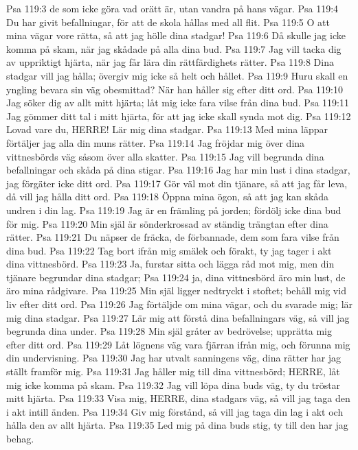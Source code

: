 Psa 119:3  de som icke göra vad orätt är, utan vandra på hans vägar.
Psa 119:4  Du har givit befallningar, för att de skola hållas med all flit.
Psa 119:5  O att mina vägar vore rätta, så att jag hölle dina stadgar!
Psa 119:6  Då skulle jag icke komma på skam, när jag skådade på alla dina bud.
Psa 119:7  Jag vill tacka dig av uppriktigt hjärta, när jag får lära din rättfärdighets rätter.
Psa 119:8  Dina stadgar vill jag hålla; övergiv mig icke så helt och hållet.
Psa 119:9  Huru skall en yngling bevara sin väg obesmittad? När han håller sig efter ditt ord.
Psa 119:10  Jag söker dig av allt mitt hjärta; låt mig icke fara vilse från dina bud.
Psa 119:11  Jag gömmer ditt tal i mitt hjärta, för att jag icke skall synda mot dig.
Psa 119:12  Lovad vare du, HERRE! Lär mig dina stadgar.
Psa 119:13  Med mina läppar förtäljer jag alla din muns rätter.
Psa 119:14  Jag fröjdar mig över dina vittnesbörds väg såsom över alla skatter.
Psa 119:15  Jag vill begrunda dina befallningar och skåda på dina stigar.
Psa 119:16  Jag har min lust i dina stadgar, jag förgäter icke ditt ord.
Psa 119:17  Gör väl mot din tjänare, så att jag får leva, då vill jag hålla ditt ord.
Psa 119:18  Öppna mina ögon, så att jag kan skåda undren i din lag.
Psa 119:19  Jag är en främling på jorden; fördölj icke dina bud för mig.
Psa 119:20  Min själ är sönderkrossad av ständig trängtan efter dina rätter.
Psa 119:21  Du näpser de fräcka, de förbannade, dem som fara vilse från dina bud.
Psa 119:22  Tag bort ifrån mig smälek och förakt, ty jag tager i akt dina vittnesbörd.
Psa 119:23  Ja, furstar sitta och lägga råd mot mig, men din tjänare begrundar dina stadgar;
Psa 119:24  ja, dina vittnesbörd äro min lust, de äro mina rådgivare.
Psa 119:25  Min själ ligger nedtryckt i stoftet; behåll mig vid liv efter ditt ord.
Psa 119:26  Jag förtäljde om mina vägar, och du svarade mig; lär mig dina stadgar.
Psa 119:27  Lär mig att förstå dina befallningars väg, så vill jag begrunda dina under.
Psa 119:28  Min själ gråter av bedrövelse; upprätta mig efter ditt ord.
Psa 119:29  Låt lögnens väg vara fjärran ifrån mig, och förunna mig din undervisning.
Psa 119:30  Jag har utvalt sanningens väg, dina rätter har jag ställt framför mig.
Psa 119:31  Jag håller mig till dina vittnesbörd; HERRE, låt mig icke komma på skam.
Psa 119:32  Jag vill löpa dina buds väg, ty du tröstar mitt hjärta.
Psa 119:33  Visa mig, HERRE, dina stadgars väg, så vill jag taga den i akt intill änden.
Psa 119:34  Giv mig förstånd, så vill jag taga din lag i akt och hålla den av allt hjärta.
Psa 119:35  Led mig på dina buds stig, ty till den har jag behag.
